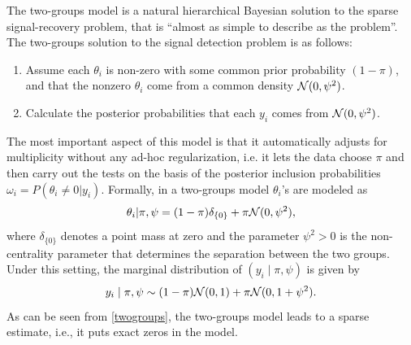 \documentclass[11pt]{article}
\begin{document}
\begin{appendix}
The two-groups model is a natural hierarchical Bayesian solution to the sparse signal-recovery problem, that is ``almost as simple to describe as the problem''.  The two-groups solution to the signal detection problem is as follows:
\begin{enumerate}
\item Assume each $\theta_i$ is non-zero with some common prior probability $(1 - \pi)$, and that the nonzero $\theta_i$ come from a common density ${\cal N}(0,\psi^2)$. 
\item Calculate the posterior probabilities that each $y_i$ comes from ${\cal N}(0,\psi^2)$. 
\end{enumerate}
The most important aspect of this model is that it automatically adjusts for multiplicity without any ad-hoc regularization, i.e. it lets the data choose $\pi$ and then carry out the tests on the basis of the posterior inclusion probabilities $\omega_i = P(\theta_i \neq 0 | y_i)$. Formally, in a two-groups model $\theta_i$'s are modeled as
\begin{equation}
\theta_i | \pi, \psi = (1-\pi)\delta_{\{0\}} + \pi {\cal N} (0, \psi^2), \label{spikeslab}
\end{equation}
where $\delta_{\{0\}}$ denotes a point mass at zero and the parameter $\psi^2>0$ is the non-centrality parameter that determines the separation between the two groups. Under this setting, the marginal distribution of $(y_i \mid \pi, \psi)$ is given by
\begin{equation}
y_i \mid \pi, \psi \sim  (1-\pi) {\cal N}(0, 1) + \pi {\cal N}(0, 1+\psi^2). \label{twogroups}
\end{equation}
As can be seen from \eqref{twogroups}, the two-groups model leads to a sparse estimate, i.e., it puts exact zeros in the model. 
\end{appendix}




\end{document}
